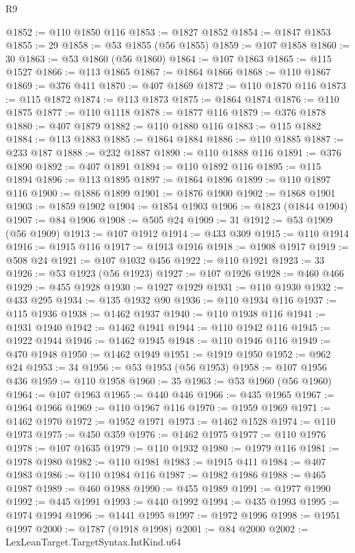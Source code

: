 \begin{lexlean}{R9}
\begin{coremodule}
@1852 := @110 @1850 @116
@1853 := @1827 @1852
@1854 := @1847 @1853
@1855 := 29
@1858 := @53 @1855 (@56 @1855)
@1859 := @107 @1858
@1860 := 30
@1863 := @53 @1860 (@56 @1860)
@1864 := @107 @1863
@1865 := @115 @1527
@1866 := @113 @1865
@1867 := @1864 @1866
@1868 := @110 @1867
@1869 := @376 @411
@1870 := @407 @1869
@1872 := @110 @1870 @116
@1873 := @115 @1872
@1874 := @113 @1873
@1875 := @1864 @1874
@1876 := @110 @1875
@1877 := @110 @1118
@1878 := @1877 @116
@1879 := @376 @1878
@1880 := @407 @1879
@1882 := @110 @1880 @116
@1883 := @115 @1882
@1884 := @113 @1883
@1885 := @1864 @1884
@1886 := @110 @1885
@1887 := @233 @187
@1888 := @232 @1887
@1890 := @110 @1888 @116
@1891 := @376 @1890
@1892 := @407 @1891
@1894 := @110 @1892 @116
@1895 := @115 @1894
@1896 := @113 @1895
@1897 := @1864 @1896
@1899 := @110 @1897 @116
@1900 := @1886 @1899
@1901 := @1876 @1900
@1902 := @1868 @1901
@1903 := @1859 @1902
@1904 := @1854 @1903
@1906 := @1823 (@1844 @1904)
@1907 := @84 @1906
@1908 := @505 @24
@1909 := 31
@1912 := @53 @1909 (@56 @1909)
@1913 := @107 @1912
@1914 := @433 @309
@1915 := @110 @1914
@1916 := @1915 @116
@1917 := @1913 @1916
@1918 := @1908 @1917
@1919 := @508 @24
@1921 := @107 @1032 @456
@1922 := @110 @1921
@1923 := 33
@1926 := @53 @1923 (@56 @1923)
@1927 := @107 @1926
@1928 := @460 @466
@1929 := @455 @1928
@1930 := @1927 @1929
@1931 := @110 @1930
@1932 := @433 @295
@1934 := @135 @1932 @90
@1936 := @110 @1934 @116
@1937 := @115 @1936
@1938 := @1462 @1937
@1940 := @110 @1938 @116
@1941 := @1931 @1940
@1942 := @1462 @1941
@1944 := @110 @1942 @116
@1945 := @1922 @1944
@1946 := @1462 @1945
@1948 := @110 @1946 @116
@1949 := @470 @1948
@1950 := @1462 @1949
@1951 := @1919 @1950
@1952 := @962 @24
@1953 := 34
@1956 := @53 @1953 (@56 @1953)
@1958 := @107 @1956 @436
@1959 := @110 @1958
@1960 := 35
@1963 := @53 @1960 (@56 @1960)
@1964 := @107 @1963
@1965 := @440 @446
@1966 := @435 @1965
@1967 := @1964 @1966
@1969 := @110 @1967 @116
@1970 := @1959 @1969
@1971 := @1462 @1970
@1972 := @1952 @1971
@1973 := @1462 @1528
@1974 := @110 @1973
@1975 := @450 @359
@1976 := @1462 @1975
@1977 := @110 @1976
@1978 := @107 @1635
@1979 := @110 @1932
@1980 := @1979 @116
@1981 := @1978 @1980
@1982 := @110 @1981
@1983 := @1915 @411
@1984 := @407 @1983
@1986 := @110 @1984 @116
@1987 := @1982 @1986
@1988 := @465 @1987
@1989 := @460 @1988
@1990 := @455 @1989
@1991 := @1977 @1990
@1992 := @445 @1991
@1993 := @440 @1992
@1994 := @435 @1993
@1995 := @1974 @1994
@1996 := @1441 @1995
@1997 := @1972 @1996
@1998 := @1951 @1997
@2000 := @1787 (@1918 @1998)
@2001 := @84 @2000
@2002 := LexLeanTarget.TargetSyntax.IntKind.u64

\end{coremodule}
\end{lexlean}
